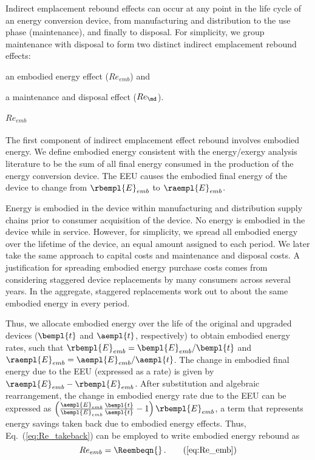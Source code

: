 Indirect emplacement rebound effects 
can occur at any point in the life cycle of an energy conversion device,
from manufacturing and distribution 
to the use phase (maintenance),
and finally to disposal.
For simplicity, we group maintenance with disposal to form
two distinct indirect emplacement rebound effects:
%
\begin{enumerate*}[label={(\alph*)}]
	
  \item an embodied energy effect ($Re_{emb}$) and 
  
  \item a maintenance and disposal effect ($Re_{\md}$).
    
\end{enumerate*}


\paragraph{$Re_{emb}$}
\label{sec:Re_emb}

The first component of indirect emplacement effect rebound
involves embodied energy.
We define embodied energy consistent with the energy/exergy analysis literature
to be the sum of all final energy consumed
in the production of the energy conversion device.
The EEU
causes the embodied final energy of the device to change
from $\rbempl{E}_{emb}$ to $\raempl{E}_{emb}$.

Energy is embodied in the device within manufacturing and distribution supply chains
prior to consumer acquisition of the device.
No energy is embodied in the device while in service.
However, for simplicity, we spread all embodied energy
over the lifetime of the device,
an equal amount assigned to each period.
We later take the same approach to capital costs and
maintenance and disposal costs.
A justification for spreading embodied energy purchase costs comes from considering
staggered device replacements by many consumers across several years.
In the aggregate, staggered replacements
work out to about the same embodied energy in every period.

Thus, we allocate embodied energy over the life of the original and upgraded devices
($\bempl{t}$ and $\aempl{t}$, respectively)
to obtain embodied energy rates, such that
$\rbempl{E}_{emb} = \bempl{E}_{emb} / \bempl{t}$
and 
$\raempl{E}_{emb} = \aempl{E}_{emb} / \aempl{t}$.
The change in embodied final energy due to the EEU (expressed as a rate) is given by
$\raempl{E}_{emb} - \rbempl{E}_{emb}$.
After substitution and algebraic rearrangement,
the change in embodied energy rate due to the EEU can be expressed as
$\left( \frac{\aempl{E}_{emb}}{\bempl{E}_{emb}}
  \frac{\bempl{t}}{\aempl{t}} - 1 \right) \rbempl{E}_{emb}$, 
a term that represents energy savings taken back due to embodied energy effects.
Thus, Eq.~(\ref{eq:Re_takeback}) can be employed to write embodied energy rebound as
%
\begin{equation} 
  Re_{emb} = \Reembeqn{} \, . \tag{\ref{eq:Re_emb}}
\end{equation}

